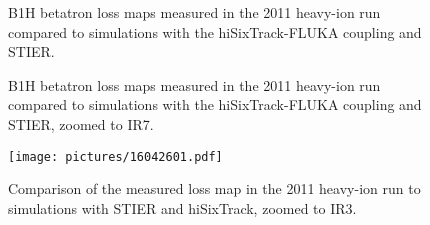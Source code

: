 \begin{figure}[t]
  \centering
    \caption{B1H betatron loss maps measured in the 2011 heavy-ion run compared to simulations with the hiSixTrack-FLUKA coupling and STIER.}  
    \label{pic:16042202}
  \end{figure}





\begin{figure}[t]
  \centering
  \caption{B1H betatron loss maps measured in the 2011 heavy-ion run compared to simulations with the hiSixTrack-FLUKA coupling and STIER, zoomed to IR7.}  
  \label{pic:16070803}
  \end{figure}


\begin{figure}[t]  
    \centering
    \texttt{[image: pictures/16042601.pdf]}
    \caption{Comparison of the measured loss map in the 2011 heavy-ion run to simulations with STIER and hiSixTrack, zoomed to IR3.}  
    \label{pic:16042501}
\end{figure}

